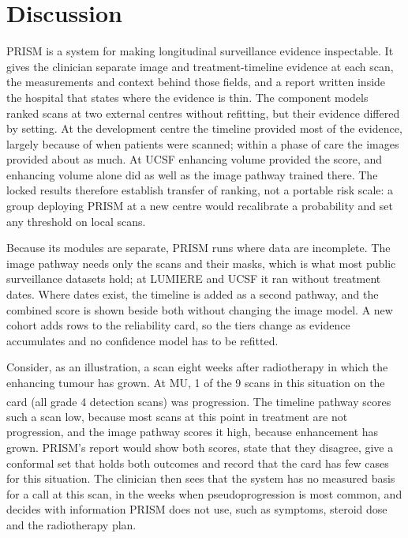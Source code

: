 \documentclass[largeformat]{interact} %
\newcommand{\expl}{\textsuperscript{\textdagger}}
\begin{document}
\section{Discussion}\label{sec:4}

PRISM is a system for making longitudinal surveillance evidence inspectable. It gives the clinician separate image
and treatment-timeline evidence at each scan, the measurements and context behind those fields, and a report written
inside the hospital that states where the evidence is thin. The component models ranked scans at two external centres
without refitting, but their evidence differed by setting. At the development centre the timeline provided most of the
evidence, largely because of when patients were scanned; within a phase of care the images provided about as much. At
UCSF enhancing volume provided the score, and enhancing volume alone did as well as the image pathway trained there.
The locked results therefore establish transfer of ranking, not a portable risk scale: a group deploying PRISM at a
new centre would recalibrate a probability and set any threshold on local scans.

Because its modules are separate, PRISM runs where data are incomplete. The image pathway needs only the scans and
their masks, which is what most public surveillance datasets hold; at LUMIERE and UCSF it ran without treatment
dates. Where dates exist, the timeline is added as a second pathway, and the combined score is shown beside both without changing the image model. A new cohort adds rows to the reliability card,
so the tiers change as evidence accumulates and no confidence model has to be refitted.

Consider, as an illustration, a scan eight weeks after radiotherapy in which the enhancing tumour has grown. At MU, 1
of the 9 scans in this situation on the card (all grade 4 detection scans) was progression\expl. The timeline pathway scores such a scan
low, because most scans at this point in treatment are not progression, and the image pathway scores it high, because
enhancement has grown. PRISM's report would show both scores, state that they disagree, give a conformal set that
holds both outcomes and record that the card has few cases for this situation. The clinician then sees that the
system has no measured basis for a call at this scan, in the weeks when pseudoprogression is most common, and decides
with information PRISM does not use, such as symptoms, steroid dose and the radiotherapy plan.
\end{document}
